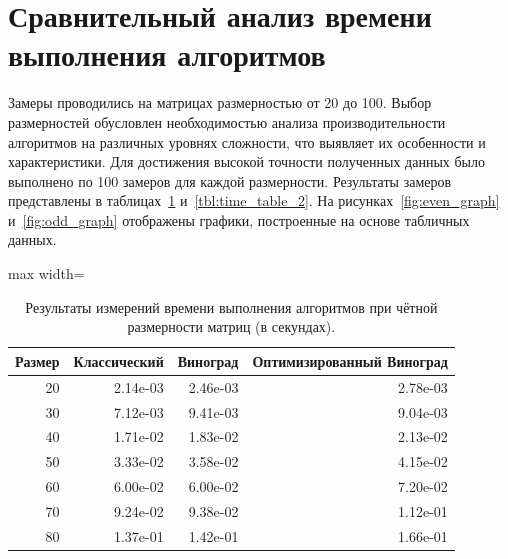 \documentclass[a4paper, 12pt]{extreport}
\begin{document}
\section{Сравнительный анализ времени выполнения алгоритмов}
\justifying

Замеры проводились на матрицах размерностью от 20 до 100. Выбор размерностей обусловлен необходимостью анализа производительности алгоритмов на различных уровнях сложности, что выявляет их особенности и характеристики. Для достижения высокой точности полученных данных было выполнено по 100 замеров для каждой размерности.
Результаты замеров представлены в таблицах~\ref{tbl:time_table_1} и~\ref{tbl:time_table_2}. На рисунках~\ref{fig:even_graph} и~\ref{fig:odd_graph} отображены графики, построенные на основе табличных данных.

\begin{table}[h]
    \centering
    \begin{adjustbox}{max width=\textwidth} 
    \begin{tabular}{|r|r|r|r|} 
    \hline
    Размер & Классический & Виноград & Оптимизированный Виноград \\ 
    \hline
    20    & 2.14e-03    & 2.46e-03 & 2.78e-03 \\ \hline
    30    & 7.12e-03    & 9.41e-03 & 9.04e-03 \\ \hline
    40    & 1.71e-02    & 1.83e-02 & 2.13e-02 \\ \hline
    50    & 3.33e-02    & 3.58e-02 & 4.15e-02 \\ \hline
    60    & 6.00e-02    & 6.00e-02 & 7.20e-02 \\ \hline
    70    & 9.24e-02    & 9.38e-02 & 1.12e-01 \\ \hline
    80    & 1.37e-01    & 1.42e-01 & 1.66e-01 \\ \hline
    \end{tabular}
    \end{adjustbox}
    \caption{Результаты измерений времени выполнения алгоритмов при чётной размерности матриц (в секундах).}
    \label{tbl:time_table_1}
\end{table}
\end{document}
